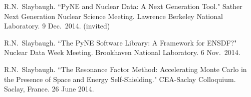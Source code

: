\begin{bibsection}

\item R.N.\ Slaybaugh. ``PyNE and Nuclear Data: A Next Generation Tool." Sather Next Generation Nuclear Science Meeting. Lawrence Berkeley National Laboratory. 9 Dec.\ 2014. (invited)




\item R.N.\ Slaybaugh. ``The PyNE Software Library: A Framework for ENSDF?" Nuclear Data Week Meeting. Brookhaven National Laboratory. 6 Nov.\ 2014. 



\item R.N.\ Slaybaugh. ``The Resonance Factor Method: Accelerating Monte Carlo in the Presence of Space and Energy Self-Shielding." CEA-Saclay Colloquium. Saclay, France. 26 June 2014.



\end{bibsection}
